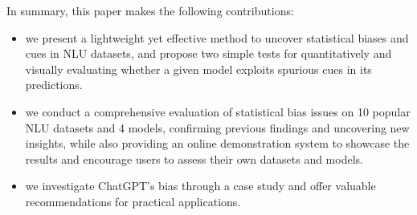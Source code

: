In summary, this paper makes the following contributions:
\begin{itemize}

\item we present a lightweight yet effective method to uncover statistical biases and cues in NLU datasets, and propose two simple tests for quantitatively and visually evaluating whether a given model exploits spurious cues in its predictions.

\item we conduct a comprehensive evaluation of statistical bias issues on 10 popular NLU datasets and 4 models, confirming previous findings and uncovering new insights, while also providing an online demonstration system to showcase the results and encourage users to assess their own datasets and models.
\item we investigate ChatGPT's bias through a case 
study and offer valuable recommendations for practical applications.

\end{itemize}








